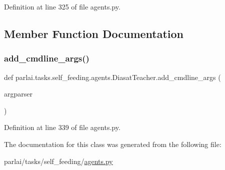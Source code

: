 Definition at line 325 of file agents.\+py.



\subsection{Member Function Documentation}
\mbox{\label{classparlai_1_1tasks_1_1self__feeding_1_1agents_1_1DiasatTeacher_a28eadfed974fe247525076406032e7ec}} 
\subsubsection{\texorpdfstring{add\+\_\+cmdline\+\_\+args()}{add\_cmdline\_args()}}
{\footnotesize\ttfamily def parlai.\+tasks.\+self\+\_\+feeding.\+agents.\+Diasat\+Teacher.\+add\+\_\+cmdline\+\_\+args (\begin{DoxyParamCaption}\item[{}]{argparser }\end{DoxyParamCaption})\hspace{0.3cm}{\ttfamily [static]}}



Definition at line 339 of file agents.\+py.



The documentation for this class was generated from the following file\+:\begin{DoxyCompactItemize}
\item 
parlai/tasks/self\+\_\+feeding/\hyperlink{parlai_2tasks_2self__feeding_2agents_8py}{agents.\+py}\end{DoxyCompactItemize}
